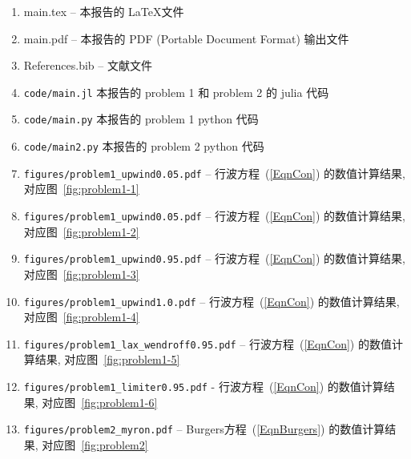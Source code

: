 \documentclass[10.5pt
]{article}
\begin{document}
\begin{enumerate}
\item
main.tex -- 本报告的 \LaTeX 文件
\item
main.pdf -- 本报告的 PDF (Portable Document Format) 输出文件
\item
References.bib -- 文献文件
\item
	\verb|code/main.jl| 本报告的 problem 1 和 problem 2 的 julia 代码
\item
	\verb|code/main.py| 本报告的 problem 1 python 代码
\item
	\verb|code/main2.py| 本报告的 problem 2 python 代码
\item
\verb|figures/problem1_upwind0.05.pdf| -- 行波方程~(\ref{EqnCon}) 的数值计算结果, 对应图~\ref{fig:problem1-1}
\item
\verb|figures/problem1_upwind0.05.pdf| -- 行波方程~(\ref{EqnCon}) 的数值计算结果, 对应图~\ref{fig:problem1-2}
\item
\verb|figures/problem1_upwind0.95.pdf| -- 行波方程~(\ref{EqnCon}) 的数值计算结果, 对应图~\ref{fig:problem1-3}
\item
\verb|figures/problem1_upwind1.0.pdf| -- 行波方程~(\ref{EqnCon}) 的数值计算结果, 对应图~\ref{fig:problem1-4}
\item
\verb|figures/problem1_lax_wendroff0.95.pdf| -- 行波方程~(\ref{EqnCon}) 的数值计算结果, 对应图~\ref{fig:problem1-5}
\item
\verb|figures/problem1_limiter0.95.pdf| - 行波方程~(\ref{EqnCon}) 的数值计算结果, 对应图~\ref{fig:problem1-6}
\item
\verb|figures/problem2_myron.pdf| -- Burgers方程~(\ref{EqnBurgers}) 的数值计算结果, 对应图~\ref{fig:problem2}
\end{enumerate}



\end{document}

